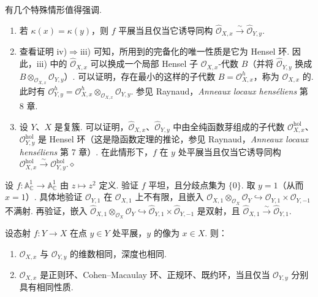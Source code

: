 \begin{remark}\label{item:ag-3-3-12}
有几个特殊情形值得强调.
\begin{enumerate}[label=\roman*)]
\item 若 $\kappa(x)=\kappa(y)$，则 $f$ 平展当且仅当它诱导同构 $\widehat{\mathcal O}_{X,x}\xrightarrow\sim\widehat{\mathcal O}_{Y,y}$.
\item 查看证明 iv)$\Rightarrow$iii) 可知，所用到的完备化的唯一性质是它为 Hensel 环. 因此，iii) 中的 $\widehat{\mathcal O}_{X,x}$ 可以换成一个局部 Hensel 子 $\mathcal O_{X,x}$-代数 $B$（并将 $\widehat{\mathcal O}_{Y,y}$ 换成 $B\otimes_{\mathcal O_{X,x}}\mathcal O_{Y,y}$）. 可以证明，存在最小的这样的子代数 $B=\mathcal O_{X,x}^h$，称为 $\mathcal O_{X,x}$ 的. 此时有 $\mathcal O_{Y,y}^h=\mathcal O_{X,x}^h\otimes_{\mathcal O_{X,x}}\mathcal O_{Y,y}$. 参见 Raynaud，\emph{Anneaux locaux henséliens} 第 8 章.
\item 设 $Y$、$X$ 是复簇. 可以证明，$\widehat{\mathcal O}_{X,x}$、$\widehat{\mathcal O}_{Y,y}$ 中由全纯函数芽组成的子代数 $\mathcal O_{X,x}^{\mathrm{hol}}$、$\mathcal O_{Y,y}^{\mathrm{hol}}$ 是 Hensel 环（这是隐函数定理的推论，参见 Raynaud，\emph{Anneaux locaux henséliens} 第 7 章）. 在此情形下，$f$ 在 $y$ 处平展当且仅当它诱导同构 $\mathcal O_{X,x}^{\mathrm{hol}}\xrightarrow\sim\mathcal O_{Y,y}^{\mathrm{hol}}$.\unskip\nobreak\hfill\ensuremath{\diamond}
\end{enumerate}
\renewcommand{\envenddiamond}{}
\end{remark}
\begin{exercise*}
设 $f:\mathbb A_{\mathbb C}^1\longrightarrow\mathbb A_{\mathbb C}^1$ 由 $z\mapsto z^2$ 定义. 验证 $f$ 平坦，且分歧点集为 $\{0\}$. 取 $y=1$（从而 $x=1$）. 具体地验证 $\mathcal O_{Y,1}$ 在 $\mathcal O_{X,1}$ 上不有限，且嵌入 $\mathcal O_{X,1}\otimes_{\mathcal O_X}\mathcal O_Y\hookrightarrow\mathcal O_{Y,1}\times\mathcal O_{Y,-1}$ 不满射. 再验证，嵌入 $\widehat{\mathcal O}_{X,1}\otimes_{\mathcal O_X}\mathcal O_Y\hookrightarrow\widehat{\mathcal O}_{Y,1}\times\widehat{\mathcal O}_{Y,-1}$ 是双射，且 $\widehat{\mathcal O}_{X,1}\xrightarrow\sim\widehat{\mathcal O}_{Y,1}$.
\end{exercise*}
\begin{corollary}[性质的保持]\label{item:ag-3-3-13}
设态射 $f:Y\longrightarrow X$ 在点 $y\in Y$ 处平展，$y$ 的像为 $x\in X$. 则：
\begin{enumerate}[label=\roman*)]
\item $\mathcal O_{X,x}$ 与 $\mathcal O_{Y,y}$ 的维数相同，深度也相同.
\item $\mathcal O_{X,x}$ 是正则环、Cohen--Macaulay 环、正规环、既约环，当且仅当 $\mathcal O_{Y,y}$ 分别具有相同性质.
\end{enumerate}
\end{corollary}
